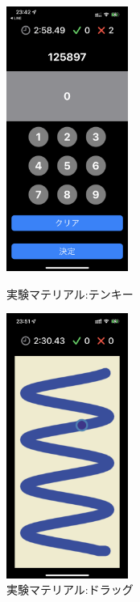\begin{figure}[htbp]
  \begin{minipage}{0.5\hsize}
    \begin{center}
       \includegraphics[width=40mm]{img/new1.png}
    \end{center}
    \caption{実験マテリアル:テンキー}
    \label{fig:tenkey}
  \end{minipage}
  \begin{minipage}{0.5\hsize}
    \begin{center}
       \includegraphics[width=40mm]{img/new2.png}
    \end{center}
    \caption{実験マテリアル:ドラッグ}
    \label{fig:drag}
  \end{minipage}
\end{figure}

